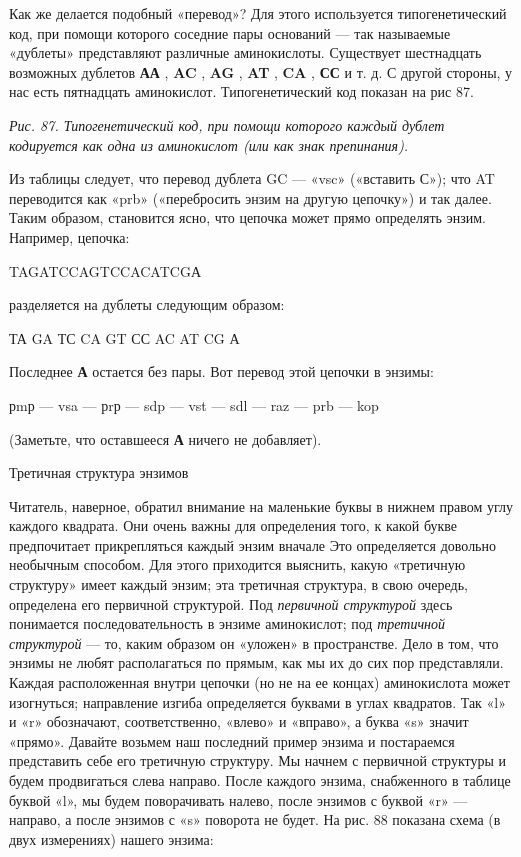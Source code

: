 Как же делается подобный «перевод»? Для этого используется типогенетический код, при помощи которого соседние пары оснований --- так называемые «дублеты» представляют различные аминокислоты. Существует шестнадцать возможных дублетов \textbf{АА} , \textbf{AC} , \textbf{AG} , \textbf{AT} , \textbf{CA} , \textbf{СС} и т. д. С другой стороны, у нас есть пятнадцать аминокислот. Типогенетический код показан на рис 87.

\emph{Рис. 87. Типогенетический код, при помощи которого каждый дублет кодируется как одна из аминокислот (или как знак препинания).}

Из таблицы следует, что перевод дублета GC --- «vsc» («вставить С»); что AT переводится как «prb» («перебросить энзим на другую цепочку») и так далее. Таким образом, становится ясно, что цепочка может прямо определять энзим. Например, цепочка:

TAGATCCAGTCCACATCGА

разделяется на дублеты следующим образом:

ТА GA ТС CA GT СС AC AT CG А

Последнее \textbf{А} остается без пары. Вот перевод этой цепочки в энзимы:

рmр --- vsa --- рrр --- sdp --- vst --- sdl --- raz --- prb --- kop

(Заметьте, что оставшееся \textbf{А} ничего не добавляет).

Третичная структура энзимов

Читатель, наверное, обратил внимание на маленькие буквы в нижнем правом углу каждого квадрата. Они очень важны для определения того, к какой букве предпочитает прикрепляться каждый энзим вначале Это определяется довольно необычным способом. Для этого приходится выяснить, какую «третичную структуру» имеет каждый энзим; эта третичная структура, в свою очередь, определена его первичной структурой. Под \emph{первичной структурой} здесь понимается последовательность в энзиме аминокислот; под \emph{третичной структурой} --- то, каким образом он «уложен» в пространстве. Дело в том, что энзимы не любят располагаться по прямым, как мы их до сих пор представляли. Каждая расположенная внутри цепочки (но не на ее концах) аминокислота может изогнуться; направление изгиба определяется буквами в углах квадратов. Так «l» и «r» обозначают, соответственно, «влево» и «вправо», а буква «s» значит «прямо». Давайте возьмем наш последний пример энзима и постараемся представить себе его третичную структуру. Мы начнем с первичной структуры и будем продвигаться слева направо. После каждого энзима, снабженного в таблице буквой «l», мы будем поворачивать налево, после энзимов с буквой «r» --- направо, а после энзимов с «s» поворота не будет. На рис. 88 показана схема (в двух измерениях) нашего энзима:

